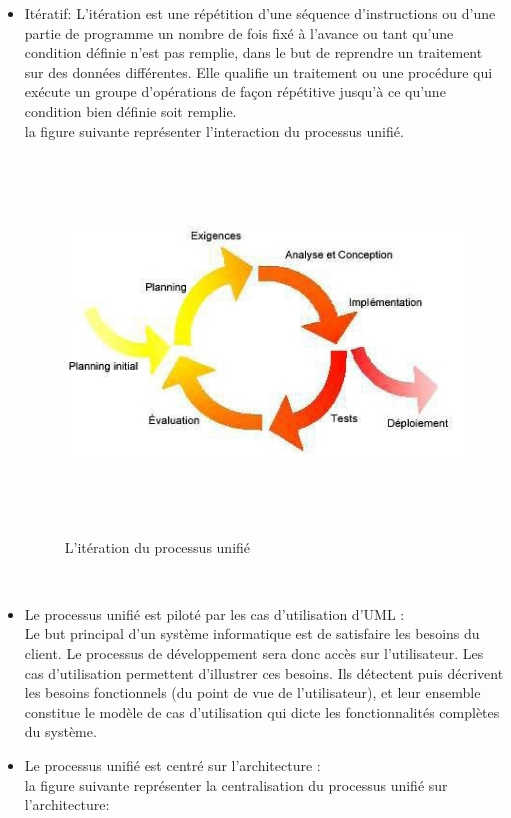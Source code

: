 \documentclass[12 pt]{report}
\begin{document}
\begin{itemize}[font=\color{black} \Large, label=]
\item Itératif:
L'itération est une répétition d'une séquence d'instructions ou d'une partie de programme un nombre de fois fixé à l'avance ou tant qu'une condition définie n'est pas remplie, dans le but de reprendre un traitement sur des données différentes. Elle qualifie un traitement ou une procédure qui exécute un groupe d'opérations de façon répétitive jusqu'à ce qu'une condition bien définie soit remplie.
\\
la figure suivante représenter l'interaction du processus unifié.  
\begin{figure}[h]
\includegraphics[height=10cm]{pic1.jpg}
\caption{L'itération du  processus unifié }
\end{figure}
\\

\item Le processus unifié  est piloté par les cas d'utilisation d'UML :
 \\
Le but principal d'un système informatique est de satisfaire les besoins du client. Le processus de développement sera donc accès sur l'utilisateur. Les cas d'utilisation permettent d'illustrer ces besoins.
Ils détectent puis décrivent les besoins fonctionnels (du point de vue de l'utilisateur), et leur ensemble constitue le modèle de cas d'utilisation qui dicte les fonctionnalités complètes du système.
\newpage
\item 	Le processus unifié  est centré sur l’architecture : 
\\
 la figure suivante représenter la centralisation du processus unifié sur l'architecture:


\end{itemize}
\end{document}
